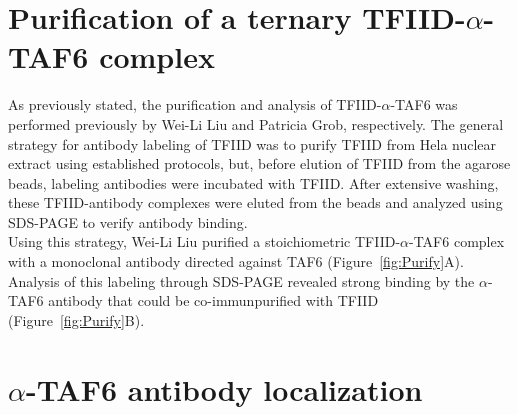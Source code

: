 \section{Purification of a ternary TFIID-$\alpha$-TAF6 complex}

As previously stated, the purification and analysis of TFIID-$\alpha$-TAF6 was performed previously by Wei-Li Liu and Patricia Grob, respectively. The general strategy for antibody labeling of TFIID was to purify TFIID from Hela nuclear extract using established protocols, but, before elution of TFIID from the agarose beads, labeling antibodies were incubated with TFIID. After extensive washing, these TFIID-antibody complexes were eluted from the beads and analyzed using SDS-PAGE to verify antibody binding. \\
\indent Using this strategy, Wei-Li Liu purified a stoichiometric TFIID-$\alpha$-TAF6 complex with a monoclonal antibody directed against TAF6 (Figure~\ref{fig:Purify}A). Analysis of this labeling through SDS-PAGE revealed strong binding by the $\alpha$-TAF6 antibody that could be co-immunpurified with TFIID (Figure~\ref{fig:Purify}B). 

\section{$\alpha$-TAF6 antibody localization}

